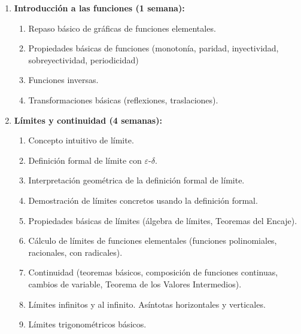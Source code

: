 \begin{refsection}
\begin{enumerate}

\item \textbf{Introducción a las funciones (1 semana):} 
\begin{enumerate}
    \item Repaso básico de gráficas de funciones elementales.
    \item Propiedades básicas de funciones (monotonía, paridad, inyectividad, sobreyectividad, periodicidad)
    \item Funciones inversas.
    \item Transformaciones básicas (reflexiones, traslaciones).
\end{enumerate}

\item \textbf{Límites y continuidad (4 semanas):} 
\begin{enumerate}
    \item Concepto intuitivo de límite.
    \item Definición formal de límite con $\varepsilon$-$\delta$.
    \item Interpretación geométrica de la definición formal de límite.
    \item Demostración de límites concretos usando la definición formal. 
    \item Propiedades básicas de límites (álgebra de límites, Teoremas del Encaje).
    \item Cálculo de límites de funciones elementales (funciones polinomiales, racionales, con radicales).
    \item Continuidad (teoremas básicos, composición de funciones continuas, cambios de variable, Teorema de los Valores Intermedios).
    \item Límites infinitos y al infinito. Asíntotas horizontales y verticales.
    \item Límites trigonométricos básicos.
\end{enumerate}


\end{enumerate}
\end{refsection}
